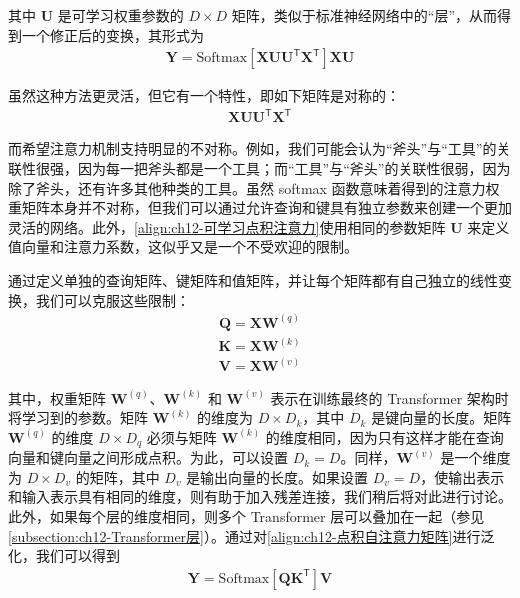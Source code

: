 \documentclass[../../main.tex]{subfiles}
\begin{document}
其中 $\mathbf{U}$ 是可学习权重参数的 $D\times D$ 矩阵，类似于标准神经网络中的“层”，从而得到一个修正后的变换，其形式为
\begin{align}
\mathbf{Y}=\mathrm{Softmax}\left[\mathbf{X}\mathbf{U}\mathbf{U}^{\mathsf{T}}\mathbf{X}^{\mathsf{T}}\right]\mathbf{X}\mathbf{U}
\label{align:ch12-可学习点积注意力}
\end{align}

虽然这种方法更灵活，但它有一个特性，即如下矩阵是对称的：
\begin{align}
\mathbf{X}\mathbf{U}\mathbf{U}^{\mathsf{T}}\mathbf{X}^{\mathsf{T}}
\label{align:ch12-对称注意力矩阵}
\end{align}

而希望注意力机制支持明显的不对称。例如，我们可能会认为“斧头”与“工具”的关联性很强，因为每一把斧头都是一个工具；而“工具”与“斧头”的关联性很弱，因为除了斧头，还有许多其他种类的工具。虽然 softmax 函数意味着得到的注意力权重矩阵本身并不对称，但我们可以通过允许查询和键具有独立参数来创建一个更加灵活的网络。此外，\eqref{align:ch12-可学习点积注意力}使用相同的参数矩阵 $\mathbf{U}$ 来定义值向量和注意力系数，这似乎又是一个不受欢迎的限制。

通过定义单独的查询矩阵、键矩阵和值矩阵，并让每个矩阵都有自己独立的线性变换，我们可以克服这些限制：
\begin{align}
\mathbf{Q}=\mathbf{X}\mathbf{W}^{(q)}
\label{align:ch12-查询矩阵}
\end{align}
\begin{align}
\mathbf{K}=\mathbf{X}\mathbf{W}^{(k)}
\label{align:ch12-键矩阵}
\end{align}
\begin{align}
\mathbf{V}=\mathbf{X}\mathbf{W}^{(v)}
\label{align:ch12-值矩阵}
\end{align}

其中，权重矩阵 $\mathbf{W}^{(q)}$、$\mathbf{W}^{(k)}$ 和 $\mathbf{W}^{(v)}$ 表示在训练最终的 Transformer 架构时将学习到的参数。矩阵 $\mathbf{W}^{(k)}$ 的维度为 $D\times D_k$，其中 $D_k$ 是键向量的长度。矩阵 $\mathbf{W}^{(q)}$ 的维度 $D\times D_q$ 必须与矩阵 $\mathbf{W}^{(k)}$ 的维度相同，因为只有这样才能在查询向量和键向量之间形成点积。为此，可以设置 $D_k=D$。同样，$\mathbf{W}^{(v)}$ 是一个维度为 $D\times D_v$ 的矩阵，其中 $D_v$ 是输出向量的长度。如果设置 $D_v=D$，使输出表示和输入表示具有相同的维度，则有助于加入残差连接，我们稍后将对此进行讨论。此外，如果每个层的维度相同，则多个 Transformer 层可以叠加在一起（参见\cref{subsection:ch12-Transformer层}）。通过对\eqref{align:ch12-点积自注意力矩阵}进行泛化，我们可以得到
\begin{align}
\mathbf{Y}=\mathrm{Softmax}\left[\mathbf{Q}\mathbf{K}^{\mathsf{T}}\right]\mathbf{V}
\label{align:ch12-通用注意力}
\end{align}
\end{document}
